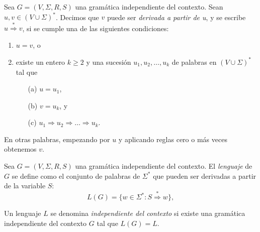 \documentclass[twoside]{article}
\begin{document}
\newpage

\begin{defi}
Sea $G=(V,\Sigma,R,S)$ una gramática independiente del contexto. Sean $u,v\in(V\cup\Sigma)^*$. Decimos que $v$ puede ser \emph{derivada a partir de u}, y se escribe $u\overset{*}{\Rightarrow} v$, si se cumple una de las siguientes condiciones:
\begin{enumerate}
\item $u=v$, o
\item existe un entero $k\geq 2$ y una sucesión $u_1,u_2,\dots, u_k$ de palabras en $(V\cup\Sigma)^*$ tal que
\begin{itemize}
\item[(a)] $u=u_1$,
\item[(b)] $v=u_k$, y
\item[(c)] $u_1\Rightarrow u_2\Rightarrow\dots\Rightarrow u_k$.
\end{itemize}
\end{enumerate} 
En otras palabras, empezando por $u$ y aplicando reglas cero o más veces obtenemos $v$. 
\end{defi}

\begin{defi}
Sea $G=(V,\Sigma,R,S)$ una gramática independiente del contexto. El \emph{lenguaje} de $G$ se define como el conjunto de palabras de $\Sigma^*$ que pueden ser derivadas a partir de la variable $S$:
$$L(G)=\{w\in\Sigma^*: S\overset{*}{\Rightarrow} w\},$$
\end{defi}

\begin{defi}
Un lenguaje $L$ se denomina \emph{independiente del contexto} si existe una gramática independiente del contexto $G$ tal que $L(G)=L$. 
\end{defi}
\end{document}

